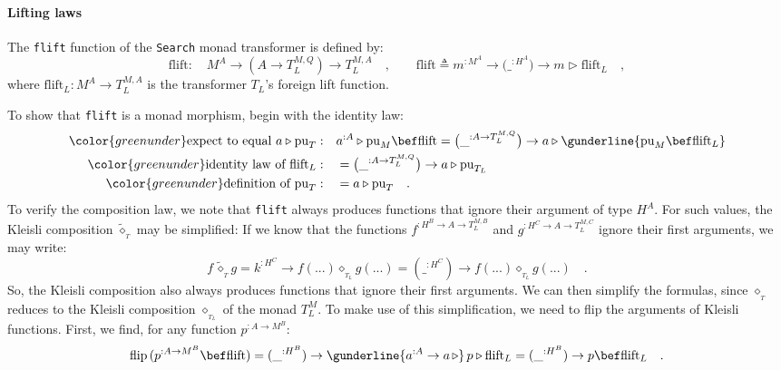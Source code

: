 \paragraph{Lifting laws}

The \lstinline!flift! function of the \lstinline!Search! monad transformer
is defined by:
\[
\text{flift}:\quad M^{A}\rightarrow(A\rightarrow T_{L}^{M,Q})\rightarrow T_{L}^{M,A}\quad,\quad\quad\text{flift}\triangleq m^{:M^{A}}\rightarrow\big(\_^{:H^{A}}\big)\rightarrow m\triangleright\text{flift}_{L}\quad,
\]
where $\text{flift}_{L}:M^{A}\rightarrow T_{L}^{M,A}$ is the transformer
$T_{L}$\textsf{'}s foreign lift function.

To show that \lstinline!flift! is a monad morphism, begin with the
identity law:
\begin{align*}
{\color{greenunder}\text{expect to equal }a\triangleright\text{pu}_{T}:}\quad & a^{:A}\triangleright\text{pu}_{M}\bef\text{flift}=\big(\_^{:A\rightarrow T_{L}^{M,Q}}\big)\rightarrow a\triangleright\gunderline{\text{pu}_{M}\bef\text{flift}_{L}}\\
{\color{greenunder}\text{identity law of }\text{flift}_{L}:}\quad & =\big(\_^{:A\rightarrow T_{L}^{M,Q}}\big)\rightarrow a\triangleright\text{pu}_{T_{L}}\\
{\color{greenunder}\text{definition of }\text{pu}_{T}:}\quad & =a\triangleright\text{pu}_{T}\quad.
\end{align*}
To verify the composition law, we note that \lstinline!flift! always
produces functions that ignore their argument of type $H^{A}$. For
such values, the Kleisli composition $\tilde{\diamond}_{_{T}}$ may
be simplified: If we know that the functions $f^{:H^{B}\rightarrow A\rightarrow T_{L}^{M,B}}$
and $g^{:H^{C}\rightarrow A\rightarrow T_{L}^{M,C}}$ ignore their
first arguments, we may write:
\[
f\,\tilde{\diamond}_{_{T}}g=k^{:H^{C}}\rightarrow f(...)\diamond_{_{T_{L}}}g(...)=(\_^{:H^{C}})\rightarrow f(...)\diamond_{_{T_{L}}}g(...)\quad.
\]
So, the Kleisli composition also always produces functions that ignore
their first arguments. We can then simplify the formulas, since $\diamond_{_{T}}$
reduces to the Kleisli composition $\diamond_{_{T_{L}}}$ of the monad
$T_{L}^{M}$. To make use of this simplification, we need to flip
the arguments of Kleisli functions. First, we find, for any function
$p^{:A\rightarrow M^{B}}$:
\[
\text{flip}\,(p^{:A\rightarrow M^{B}}\bef\text{flift})=(\_^{:H^{B}})\rightarrow\gunderline{a^{:A}\rightarrow a\,\triangleright}\,p\triangleright\text{flift}_{L}=(\_^{:H^{B}})\rightarrow p\bef\text{flift}_{L}\quad.
\]
